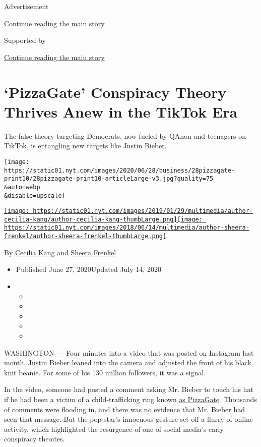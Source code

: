 Advertisement

\protect\hyperlink{after-top}{Continue reading the main story}

Supported by

\protect\hyperlink{after-sponsor}{Continue reading the main story}

\hypertarget{pizzagate-conspiracy-theory-thrives-anew-in-the-tiktok-era}{%
\section{`PizzaGate' Conspiracy Theory Thrives Anew in the TikTok
Era}\label{pizzagate-conspiracy-theory-thrives-anew-in-the-tiktok-era}}

The false theory targeting Democrats, now fueled by QAnon and teenagers
on TikTok, is entangling new targets like Justin Bieber.

\texttt{[image: https://static01.nyt.com/images/2020/06/28/business/28pizzagate-print10/28pizzagate-print10-articleLarge-v3.jpg?quality=75\\\&auto=webp\\\&disable=upscale]}

\href{https://www.nytimes.com/by/cecilia-kang}{\texttt{[image: https://static01.nyt.com/images/2019/01/29/multimedia/author-cecilia-kang/author-cecilia-kang-thumbLarge.png]}}\href{https://www.nytimes.com/by/sheera-frenkel}{\texttt{[image: https://static01.nyt.com/images/2018/06/14/multimedia/author-sheera-frenkel/author-sheera-frenkel-thumbLarge.png]}}

By \href{https://www.nytimes.com/by/cecilia-kang}{Cecilia Kang} and
\href{https://www.nytimes.com/by/sheera-frenkel}{Sheera Frenkel}

\begin{itemize}
\item
  Published June 27, 2020Updated July 14, 2020
\item
  \begin{itemize}
  \item
  \item
  \item
  \item
  \item
  \end{itemize}
\end{itemize}

WASHINGTON --- Four minutes into a video that was posted on Instagram
last month, Justin Bieber leaned into the camera and adjusted the front
of his black knit beanie. For some of his 130 million followers, it was
a signal.

In the video, someone had posted a comment asking Mr. Bieber to touch
his hat if he had been a victim of a child-trafficking ring known
\href{https://www.nytimes.com/search?query=Pizzagate}{as PizzaGate}.
Thousands of comments were flooding in, and there was no evidence that
Mr. Bieber had seen that message. But the pop star's innocuous gesture
set off a flurry of online activity, which highlighted the resurgence of
one of social media's early conspiracy theories.

